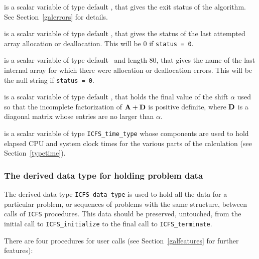 \documentclass{galahad}
\newcommand{\packagename}{ICFS}
\begin{document}
\begin{description}
 is a scalar variable of type default \integer, that gives the
exit status of the algorithm.
See Section~\ref{galerrors} for details.

 is a scalar variable of type default \integer, that gives
the status of the last attempted array allocation or deallocation.
This will be 0 if {\tt status = 0}.

 is a scalar variable of type default \character\
and length 80, that  gives the name of the last internal array
for which there were allocation or deallocation errors.
This will be the null string if {\tt status = 0}.

 is a scalar variable of type default \realdp, that holds
the final value of the shift $\alpha$ used so that the incomplete
factorization of ${\mathbf{A}} + {\mathbf{D}}$ is positive definite, where ${\mathbf{D}}$ is
a diagonal matrix whose entries are no larger than $\alpha$.

 is a scalar variable of type {\tt \packagename\_time\_type}
whose components are used to hold elapsed CPU and system clock times for the
various parts of the calculation (see Section~\ref{typetime}).

\end{description}


\subsubsection{The derived data type for holding problem data}\label{typedata}
The derived data type
{\tt \packagename\_data\_type}
is used to hold all the data for a particular problem,
or sequences of problems with the same structure, between calls of
{\tt \packagename} procedures.
This data should be preserved, untouched,
from the initial call to
{\tt \packagename\_initialize}
to the final call to
{\tt \packagename\_terminate}.


\galarguments
There are four procedures for user calls
(see Section~\ref{galfeatures} for further features):
\end{document}

